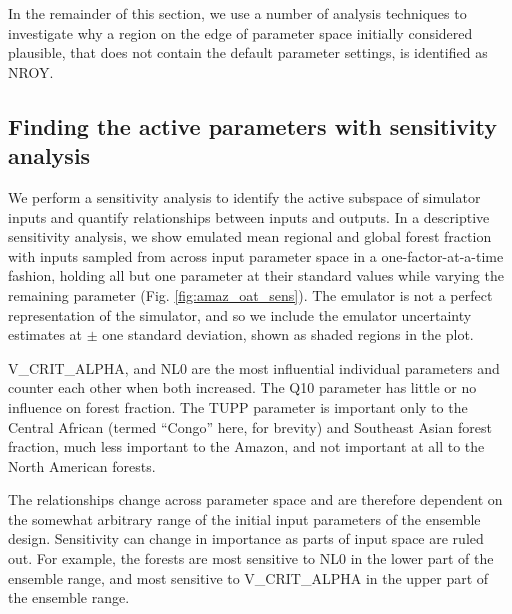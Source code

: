 \documentclass[esd, manuscript]{copernicus}
\begin{document}

In the remainder of this section, we use a number of analysis techniques to investigate why a region on the edge of parameter space initially considered plausible, that does not contain the default parameter settings, is identified as NROY.

\subsection{Finding the active parameters with sensitivity analysis}\label{ssec:sensitivity}

We perform a sensitivity analysis to identify the active subspace of simulator inputs and quantify relationships between inputs and outputs. In a descriptive sensitivity analysis, we show emulated mean regional and global forest fraction with inputs sampled from across input parameter space in a one-factor-at-a-time fashion, holding all but one parameter at their standard values while varying the remaining parameter (Fig. \ref{fig:amaz_oat_sens}). The emulator is not a perfect representation of the simulator, and so we include the emulator uncertainty estimates at $\pm$ one standard deviation, shown as shaded regions in the plot.

V\_CRIT\_ALPHA, and NL0 are the most influential individual parameters and counter each other when both increased. The Q10 parameter has little or no influence on forest fraction. The TUPP parameter is important only to the Central African (termed ``Congo'' here, for brevity) and Southeast Asian forest fraction, much less important to the Amazon, and not important at all to the North American forests. 

The relationships change across parameter space and are therefore dependent on the somewhat arbitrary range of the initial input parameters of the ensemble design. Sensitivity can change in importance as parts of input space are ruled out. For example, the forests are most sensitive to NL0 in the lower part of the ensemble range, and most sensitive to V\_CRIT\_ALPHA in the upper part of the ensemble range.

\end{document}
